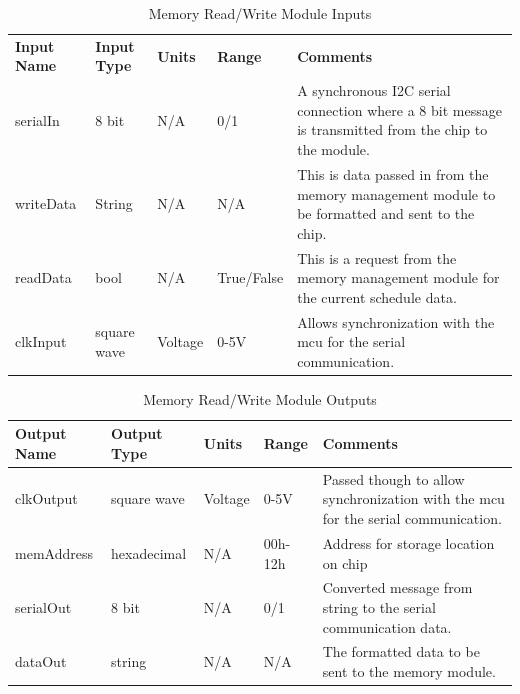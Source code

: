 \documentclass[12pt,titlepage]{article}
\begin{document}
\begin{table}[ht!]
\begin{center}
\begin{adjustbox}{max width=\textwidth}
\small
\begin{tabular}{|p{}|p{}|p{}|p{}|p{}|}
 \hline
 \textbf{Input Name} & \textbf{Input Type} & \textbf{Units} &\textbf{Range} & \textbf{Comments} \\
 serialIn & 8 bit  & N/A & 0/1 & A synchronous I2C serial connection where a 8 bit message is transmitted from the chip to the module. \\
 \hline
 writeData & String  & N/A & N/A & This is data passed in from the memory management module to be formatted and sent to the chip.  \\
 \hline
  readData & bool & N/A & True/False & This is a request from the memory management module for the current schedule data.  \\
 \hline
   clkInput & square wave  & Voltage & 0-5V & Allows synchronization with the mcu for the serial communication. \\
 \hline
\end{tabular}
\end{adjustbox}
\end{center}
\caption{Memory Read/Write Module Inputs}
\end{table}

\begin{table}[ht!]
\begin{center}
\begin{adjustbox}{max width=\textwidth}
\small
\begin{tabular}{|p{}|p{}|p{}|p{}|p{}|}
 \hline
 \textbf{Output Name} & \textbf{Output Type} & \textbf{Units} &\textbf{Range} & \textbf{Comments} \\
 \hline 
  clkOutput & square wave  & Voltage & 0-5V & Passed though to allow synchronization with the mcu for the serial communication. \\
 \hline
 memAddress & hexadecimal  & N/A & 00h-12h & Address for storage location on chip \\
 \hline
  serialOut & 8 bit  & N/A & 0/1 & Converted message from string to the serial communication data.  \\
 \hline  
 dataOut & string  & N/A & N/A & The formatted data to be sent to the memory module.  \\
 \hline
\end{tabular}
\end{adjustbox}
\end{center}
\caption{Memory Read/Write Module Outputs}
\end{table}
\end{document}
